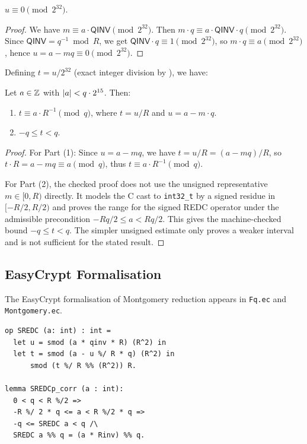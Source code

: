 \begin{lemma}[Divisibility]
  $u \equiv 0 \pmod{2^{32}}$.
\label{lem:mont_div}
\end{lemma}

\begin{proof}
  We have $m \equiv a \cdot \mathsf{QINV} \pmod{2^{32}}$.
  Then $m \cdot q \equiv a \cdot \mathsf{QINV} \cdot q \pmod{2^{32}}$.
  Since $\mathsf{QINV} = q^{-1} \bmod R$, we get
  $\mathsf{QINV} \cdot q \equiv 1 \pmod{2^{32}}$, so
  $m \cdot q \equiv a \pmod{2^{32}}$, hence $u = a - mq \equiv 0 \pmod{2^{32}}$.
\end{proof}

Defining $t = u / 2^{32}$ (exact integer division by ),
we have:

\begin{theorem}
  Let $a \in \mathbb{Z}$ with $\left|a\right| < q \cdot 2^{15}$.  Then:
  \begin{enumerate}
    \item $t \equiv a \cdot R^{-1} \pmod{q}$, where $t = u / R$ and $u = a - m \cdot q$.
    \item $-q \le t < q$.
  \end{enumerate}
\label{thm:mont_correct}
\end{theorem}

\begin{proof}
  For Part (1): Since $u = a - mq$, we have $t = u / R = (a - mq)/R$, so
  $t \cdot R = a - mq \equiv a \pmod{q}$, thus $t \equiv a \cdot R^{-1} \pmod{q}$.

  For Part (2), the checked proof does not use the unsigned representative
  $m \in [0,R)$ directly.  It models the C cast to \texttt{int32\_t} by a
  signed residue in $[-R/2,R/2)$ and proves the range for the signed REDC
  operator under the admissible precondition
  $-R q/2 \le a < R q/2$.  This gives the machine-checked bound
  $-q \le t < q$.  The simpler unsigned estimate only proves a weaker
  interval and is not sufficient for the stated result.
\end{proof}

\subsection{EasyCrypt Formalisation}

The EasyCrypt formalisation of Montgomery reduction appears in
\texttt{Fq.ec} and \texttt{Montgomery.ec}.

\begin{lstlisting}[language=EasyCrypt,
  caption={Signed REDC correctness in \texttt{Montgomery.ec}},
  label={lst:mont_ec}]
op SREDC (a: int) : int =
  let u = smod (a * qinv * R) (R^2) in
  let t = smod (a - u %/ R * q) (R^2) in
      smod (t %/ R %% (R^2)) R.

lemma SREDCp_corr (a : int):
  0 < q < R %/2 =>
  -R %/ 2 * q <= a < R %/2 * q =>
  -q <= SREDC a < q /\
  SREDC a %% q = (a * Rinv) %% q.
\end{lstlisting}

